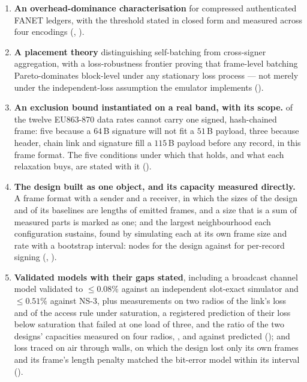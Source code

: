 \begin{enumerate}
\item \textbf{An overhead-dominance characterisation} for compressed authenticated FANET ledgers,
      with the threshold stated in closed form and measured across four encodings
      (, ).

\item \textbf{A placement theory} distinguishing self-batching from cross-signer aggregation, with
      a loss-robustness frontier proving that frame-level batching Pareto-dominates block-level
      under any stationary loss process --- not merely under the independent-loss assumption the
      emulator implements ().

\item \textbf{An exclusion bound instantiated on a real band, with its scope.} \exclCountCap{} of
      the twelve EU863-870 data rates cannot carry one signed, hash-chained frame: five because a
      $64$\,B signature will not fit a $51$\,B payload, three because header, chain link and
      signature fill a $115$\,B payload before any record, in this frame format. The five conditions under which that
      holds, and what each relaxation buys, are stated with it ().

\item \textbf{The design built as one object, and its capacity measured directly.} A frame
      format with a sender and a receiver, in which the sizes of the design and of its
      baselines are lengths of emitted frames, and a size that is a sum of measured parts is
      marked as one; and the largest neighbourhood each configuration sustains, found by
      simulating each at its own frame size and rate with a bootstrap interval:
      \nmaxLeanDesign{} nodes for the design against \nmaxLeanBase{} for per-record signing
      (, ).

\item \textbf{Validated models with their gaps stated}, including a broadcast channel model
      validated to $\leq 0.08\%$ against an independent slot-exact simulator and $\leq 0.51\%$
      against NS-3, plus measurements on two radios of the link's loss and of the access rule
      under saturation, a registered prediction of their loss below saturation that failed at
      one load of three, and the ratio of the two designs' capacities measured on four radios,
      \hwRatio, \hwRepeatRatio{} and \hwThirdRatio{} against \hwModelRatio{} predicted
      ();
      and loss traced on air through walls, on which the design lost only its own frames and
      its frame's length penalty matched the bit-error model within its interval
      ().


\end{enumerate}
